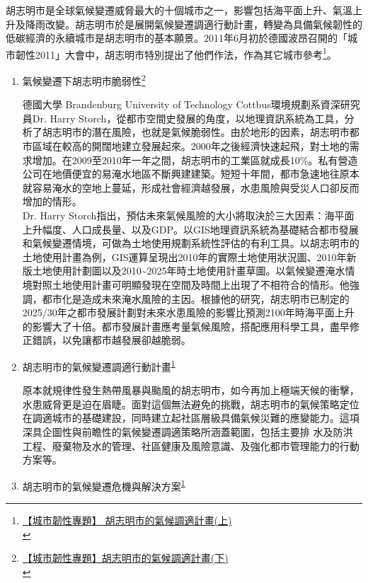 \documentclass[a4paper,12pt]{article}
\begin{document}
\begin{enumerate}
胡志明市是全球氣候變遷威脅最大的十個城市之一，影響包括海平面上升、氣溫上升及降雨改變。胡志明市於是展開氣候變遷調適行動計畫，轉變為具備氣候韌性的低碳經濟的永續城市是胡志明市的基本願景。2011年6月初於德國波昂召開的「城市韌性2011」大會中，胡志明市特別提出了他們作法，作為其它城市參考\footnote{\href{https://e-info.org.tw/node/68861}{【城市韌性專題】 胡志明市的氣候調適計畫(上)}\\\label{org5d2a69a}}。\\
\begin{enumerate}
\item 氣候變遷下胡志明市脆弱性\footnote{\href{https://e-info.org.tw/node/68862}{【城市韌性專題】胡志明市的氣候調適計畫(下)}\\\label{orgb1cb707}}
\label{sec:org27d3363}

德國大學 Brandenburg University of Technology Cottbus環境規劃系資深研究員Dr. Harry Storch，從都市空間史發展的角度，以地理資訊系統為工具，分析了胡志明市的潛在風險，也就是氣候脆弱性。由於地形的因素，胡志明市都市區域在較高的開闊地建立發展起來。2000年之後經濟快速起飛，對土地的需求增加。在2009至2010年一年之間，胡志明市的工業區就成長10\%。私有營造公司在地價便宜的易淹水地區不斷興建建築。短短十年間，都市急速地往原本就容易淹水的空地上蔓延，形成社會經濟越發展，水患風險與受災人口卻反而增加的情形。\\

Dr. Harry Storch指出，預估未來氣候風險的大小將取決於三大因素：海平面上升幅度、人口成長量、以及GDP。以GIS地理資訊系統為基礎結合都市發展和氣候變遷情境，可做為土地使用規劃系統性評估的有利工具。以胡志明市的土地使用計畫為例，GIS運算呈現出2010年的實際土地使用狀況圖、2010年新版土地使用計劃圖以及2010\textasciitilde{}2025年時土地使用計畫草圖。以氣候變遷淹水情境對照土地使用計畫可明顯發現在空間及時間上出現了不相符合的情形。他強調，都市化是造成未來淹水風險的主因。根據他的研究，胡志明市已制定的2025/30年之都市發展計劃對未來水患風險的影響比預測2100年時海平面上升的影響大了十倍。都市發展計畫應考量氣候風險，搭配應用科學工具，盡早修正錯誤，以免讓都市越發展卻越脆弱。\\
\item 胡志明市的氣候變遷調適行動計畫\textsuperscript{\ref{org5d2a69a}}
\label{sec:org73790ec}

原本就規律性發生熱帶風暴與颱風的胡志明市，如今再加上極端天候的衝擊，水患威脅更是迫在眉睫。面對這個無法避免的挑戰，胡志明市的氣候策略定位在調適城市的基礎建設，同時建立起社區層級具備氣候災難的應變能力。這項深具企圖性與前瞻性的氣候變遷調適策略所涵蓋範圍，包括主要排 水及防洪工程、廢棄物及水的管理、社區健康及風險意識、及強化都市管理能力的行動方案等。\\
\item 胡志明市的氣候變遷危機與解決方案\textsuperscript{\ref{org5d2a69a}}
\label{sec:org51c7393}


\end{enumerate}
\end{enumerate}
\end{document}
